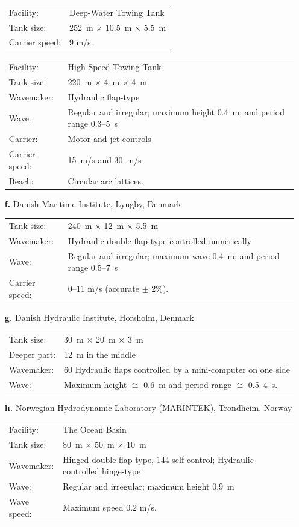 \documentclass[12pt,a4paper]{report}
\begin{document}
\begin{itemize}[leftmargin=1.5em]
\begin{tabular}{@{}ll}  
Facility:& Deep-Water Towing Tank \\
Tank size:& 252~m $\times$ 10.5~m $\times$ 5.5~m \\
Carrier speed:& 9 m/s.
\end{tabular}

\begin{tabular}{@{}ll}
Facility:& High-Speed Towing Tank \\
Tank size:& 220~m $\times$ 4~m $\times$ 4~m \\
Wavemaker:& Hydraulic flap-type \\
Wave:& Regular and irregular; maximum height 0.4~m; and period range 0.3--5~s \\
Carrier:& Motor and jet controls \\
Carrier speed:& 15~m/s and 30~m/s \\
Beach:& Circular arc lattices.
\end{tabular}

\item[\textbf{f.}] Danish Maritime Institute, Lyngby, Denmark \\
\begin{tabular}{@{}ll}
Tank size:& 240~m $\times$ 12~m $\times$ 5.5~m \\
Wavemaker:& Hydraulic double-flap type controlled numerically \\
Wave:& Regular and irregular; maximum wave 0.4~m; and period range 0.5--7~s \\
Carrier speed:& 0--11 m/s (accurate $\pm$ 2\%).
\end{tabular}

\item[\textbf{g.}] Danish Hydraulic Institute, Horsholm, Denmark \\
\begin{tabular}{@{}ll}
Tank size:& 30~m $\times$ 20~m $\times$ 3~m \\
Deeper part:& 12~m in the middle \\
Wavemaker:& 60 Hydraulic flaps controlled by a mini-computer on one side \\
Wave:& Maximum height $\cong$ 0.6~m and period range $\cong$ 0.5--4~s.
\end{tabular}

\item[\textbf{h.}] Norwegian Hydrodynamic Laboratory (MARINTEK), Trondheim, Norway \\
\begin{tabular}{@{}ll}
Facility:& The Ocean Basin \\
Tank size:& 80~m $\times$ 50~m $\times$ 10~m \\
Wavemaker:& Hinged double-flap type, 144 self-control; Hydraulic controlled hinge-type \\
Wave:& Regular and irregular; maximum height 0.9~m \\
Wave speed:& Maximum speed 0.2 m/s.
\end{tabular}
\end{itemize}
\end{document}
